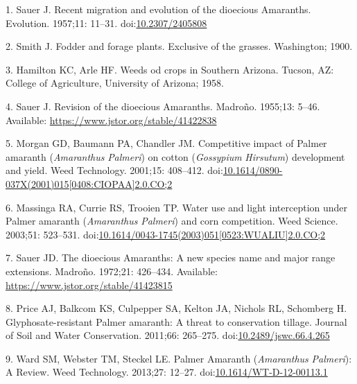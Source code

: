 \documentclass[10pt,letterpaper]{article}
\begin{document}
\hypertarget{refs}{}
\leavevmode\hypertarget{ref-sauer_recent_1957}{}%
1. Sauer J. Recent migration and evolution of the dioecious Amaranths.
Evolution. 1957;11: 11--31.
doi:\href{https://doi.org/10.2307/2405808}{10.2307/2405808}

\leavevmode\hypertarget{ref-smith_fodder_1900}{}%
2. Smith J. Fodder and forage plants. Exclusive of the grasses.
Washington; 1900.

\leavevmode\hypertarget{ref-hamilton_weeds_1958}{}%
3. Hamilton KC, Arle HF. Weeds od crops in Southern Arizona. Tucson, AZ:
College of Agriculture, University of Arizona; 1958.

\leavevmode\hypertarget{ref-sauer_revision_1955}{}%
4. Sauer J. Revision of the dioecious Amaranths. Madroño. 1955;13:
5--46. Available: \url{https://www.jstor.org/stable/41422838}

\leavevmode\hypertarget{ref-morgan_competitive_2001}{}%
5. Morgan GD, Baumann PA, Chandler JM. Competitive impact of Palmer
amaranth (\emph{Amaranthus} \emph{Palmeri}) on cotton (\emph{Gossypium}
\emph{Hirsutum}) development and yield. Weed Technology. 2001;15:
408--412.
doi:\href{https://doi.org/10.1614/0890-037X(2001)015\%5B0408:CIOPAA\%5D2.0.CO;2}{10.1614/0890-037X(2001)015{[}0408:CIOPAA{]}2.0.CO;2}

\leavevmode\hypertarget{ref-massinga_water_2003}{}%
6. Massinga RA, Currie RS, Trooien TP. Water use and light interception
under Palmer amaranth (\emph{Amaranthus} \emph{Palmeri}) and corn
competition. Weed Science. 2003;51: 523--531.
doi:\href{https://doi.org/10.1614/0043-1745(2003)051\%5B0523:WUALIU\%5D2.0.CO;2}{10.1614/0043-1745(2003)051{[}0523:WUALIU{]}2.0.CO;2}

\leavevmode\hypertarget{ref-sauer_dioecious_1972}{}%
7. Sauer JD. The dioecious Amaranths: A new species name and major range
extensions. Madroño. 1972;21: 426--434. Available:
\url{https://www.jstor.org/stable/41423815}

\leavevmode\hypertarget{ref-price_glyphosate-resistant_2011}{}%
8. Price AJ, Balkcom KS, Culpepper SA, Kelton JA, Nichols RL, Schomberg
H. Glyphosate-resistant Palmer amaranth: A threat to conservation
tillage. Journal of Soil and Water Conservation. 2011;66: 265--275.
doi:\href{https://doi.org/10.2489/jswc.66.4.265}{10.2489/jswc.66.4.265}

\leavevmode\hypertarget{ref-ward_palmer_2013}{}%
9. Ward SM, Webster TM, Steckel LE. Palmer Amaranth (\emph{Amaranthus}
\emph{Palmeri}): A Review. Weed Technology. 2013;27: 12--27.
doi:\href{https://doi.org/10.1614/WT-D-12-00113.1}{10.1614/WT-D-12-00113.1}
\end{document}

